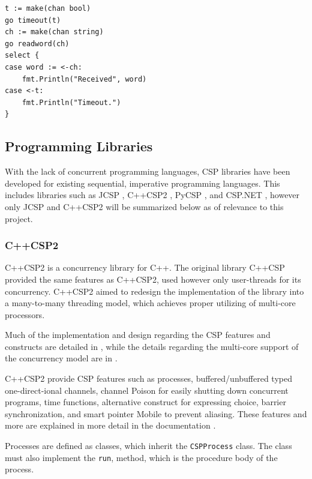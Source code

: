\begin{lstlisting}[style={Golang},frame={},numbers={none},xleftmargin={4em}]
t := make(chan bool)
go timeout(t)
ch := make(chan string)
go readword(ch)
select {
case word := <-ch:
    fmt.Println("Received", word)
case <-t:
    fmt.Println("Timeout.")
}
\end{lstlisting}


\subsection{Programming Libraries}
\label{subsec:csp_prog_lib}

With the lack of concurrent programming languages, CSP libraries have been developed for existing sequential, imperative programming languages. This includes libraries such as JCSP \citep{jcsp}, C++CSP2 \citep{c++csp2}, PyCSP \citep{pycsp}, and CSP.NET \citep{cspnet}, however only JCSP and C++CSP2 will be summarized below as of relevance to this project.


\subsubsection{C++CSP2}
\label{sssec:c++csp2}

C++CSP2 \citep{c++csp2} is a concurrency library for C++. The original library C++CSP \citep{c++csp} provided the same features as C++CSP2, used however only user-threads for its concurrency. C++CSP2 aimed to redesign the implementation of the library into a many-to-many threading model, which achieves proper utilizing of multi\hyp{}core processors. 

Much of the implementation and design regarding the CSP features and constructs are detailed in \citet{c++csp}, while the details regarding the multi-core support of the concurrency model are in \citet{c++csp2}.

C++CSP2 provide CSP features such as processes, buffered/unbuffered typed one-direct\hyp{}ional channels, channel Poison for easily shutting down concurrent programs, time functions, alternative construct for expressing choice, barrier synchronization, and smart pointer Mobile to prevent aliasing. These features and more are explained in more detail in the documentation \citep{c++csp2doc}.

Processes are defined as classes, which inherit the \texttt{CSPProcess} class. The class must also implement the \texttt{run}, method, which is the procedure body of the process. 

